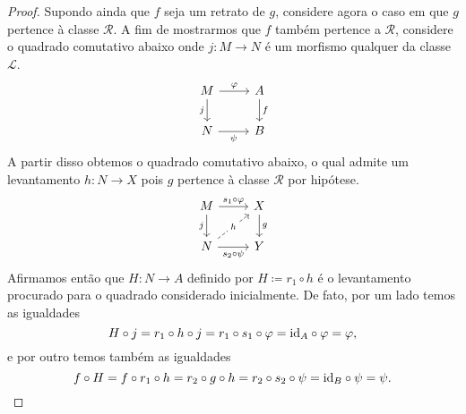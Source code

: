 \begin{proof}
  Supondo ainda que $f$ seja um retrato de $g$, considere agora o caso em que $g$ pertence à classe $\mathcal{R}$.
  A fim de mostrarmos que $f$ também pertence a $\mathcal{R}$, considere o quadrado comutativo abaixo onde $j: M \to N$ é um morfismo qualquer da classe $\mathcal{L}$.
  \begin{displaymath}
    \begin{tikzcd}
      M
      \arrow[r, "\varphi"]
      \arrow[d, "j" swap]
      & A
      \arrow[d, "f"]
      \\ N
      \arrow[r, "\psi" swap]
      & B
    \end{tikzcd}
  \end{displaymath}
  A partir disso obtemos o quadrado comutativo abaixo, o qual admite um levantamento $h: N \to X$ pois $g$ pertence à classe $\mathcal{R}$ por hipótese.
  \begin{displaymath}
    \begin{tikzcd}
      M
      \arrow[r, "s_{1} \circ \varphi"]
      \arrow[d, "j" swap]
      & X
      \arrow[d, "g"]
      \\ N
      \arrow[r, "s_{2} \circ \psi" swap]
      \arrow[ru, dashed, "h" description]
      & Y
    \end{tikzcd}
  \end{displaymath}
  Afirmamos então que $H: N \to A$ definido por $H \coloneqq r_{1} \circ h$ é o levantamento procurado para o quadrado considerado inicialmente.
  De fato, por um lado temos as igualdades
  \begin{displaymath}
    H \circ j = r_{1} \circ h \circ j = r_{1} \circ s_{1} \circ \varphi = \mathrm{id}_{A} \circ \varphi = \varphi,
  \end{displaymath}
  e por outro temos também as igualdades
  \begin{displaymath}
    f \circ H = f \circ r_{1} \circ h = r_{2} \circ g \circ h = r_{2} \circ s_{2} \circ \psi = \mathrm{id}_{B} \circ \psi = \psi.
  \end{displaymath}


\end{proof}
